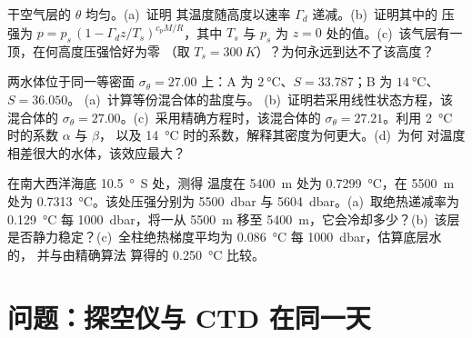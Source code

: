 \begin{exercise}[$\star\star\star$]\label{exo:b1:fluid-envelopes-structure:10}
干空气层的 $\theta$ 均匀。(a)~证明
其温度随高度以速率 $\Gamma_d$ 递减。(b)~证明其中的
压强为 $p = p_s\,(1 - \Gamma_d z/T_s)^{c_pM/R}$，其中 $T_s$ 与 $p_s$ 为
$z = 0$ 处的值。(c)~该气层有一顶，在何高度压强恰好为零
（取 $T_s = \qty{300}{K}$）？为何永远到达不了该高度？
\end{exercise}

\begin{exercise}[$\star\star\star$]\label{exo:b1:fluid-envelopes-structure:11}
两水体位于同一等密面 $\sigma_\theta = 27.00$ 上：A 为
$\qty{2}{\celsius}$、$S = 33.787$；B 为 $\qty{14}{\celsius}$、$S = 36.050$。
(a)~计算等份混合体的盐度与。
(b)~证明若采用线性状态方程，该混合体的
$\sigma_\theta = 27.00$。(c)~采用精确方程时，该混合体的
$\sigma_\theta = 27.21$。利用 \qty{2}{\celsius} 时的系数 $\alpha$ 与 $\beta$，
以及 \qty{14}{\celsius} 时的系数，解释其密度为何更大。(d)~为何
对温度相差很大的水体，该效应最大？
\end{exercise}

\begin{exercise}[$\star\star\star$]\label{exo:b1:fluid-envelopes-structure:12}
在南大西洋海底 \qty{10.5}{\degree S} 处，测得
温度在 \qty{5400}{m} 处为 \qty{0.7299}{\celsius}，在
\qty{5500}{m} 处为 \qty{0.7313}{\celsius}。该处压强分别为 \qty{5500}{dbar} 与 \qty{5604}{dbar}。(a)~取绝热递减率为
\qty{0.129}{\celsius} 每 \qty{1000}{dbar}，将一从 \qty{5500}{m} 移至
\qty{5400}{m}，它会冷却多少？(b)~该层
是否静力稳定？(c)~全柱绝热梯度平均为
\qty{0.086}{\celsius} 每 \qty{1000}{dbar}，估算底层水的，
并与由精确算法
算得的 \qty{0.250}{\celsius} 比较。
\end{exercise}

\section{问题：探空仪与 CTD 在同一天}


